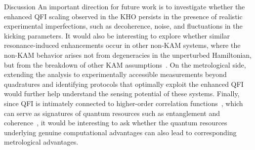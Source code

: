 \documentclass[amsmath,nobibnotes,aps,amssymb,pra, prl,aps,showpacs,superscriptaddress,twocolumn, longbibliography, reprint]{revtex4-2}
\begin{document}
\begin{section}{Discussion}
An important direction for future work is to investigate whether the enhanced QFI scaling observed in the KHO persists in the presence of realistic experimental imperfections, such as decoherence, noise, and fluctuations in the kicking parameters. It would also be interesting to explore whether similar resonance-induced enhancements occur in other non-KAM systems, where the non-KAM behavior arises not from degeneracies in the unperturbed Hamiltonian, but from the breakdown of other KAM assumptions~\cite{sankaranarayanan2001chaos, sankaranarayanan2001quantum}. On the metrological side, extending the analysis to experimentally accessible measurements beyond quadratures and identifying protocols that optimally exploit the enhanced QFI would further help understand the sensing potential of these systems. Finally, since QFI is intimately connected to higher-order correlation functions~\cite{PhysRevLett.120.040402}, which can serve as signatures of quantum resources such as entanglement and coherence~\cite{10.1063/5.0191140, varikuti2025deep}, it would be interesting to ask whether the quantum resources underlying genuine computational advantages can also lead to corresponding metrological advantages.

 





\end{section}
\end{document}

